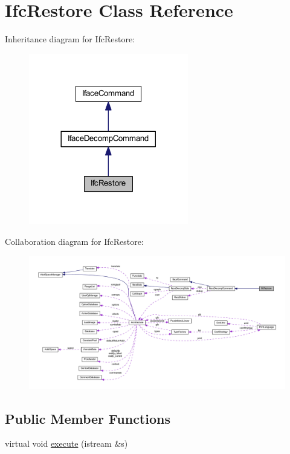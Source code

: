 \hypertarget{class_ifc_restore}{}\section{Ifc\+Restore Class Reference}
\label{class_ifc_restore}


Inheritance diagram for Ifc\+Restore\+:
\nopagebreak
\begin{figure}[H]
\begin{center}
\leavevmode
\includegraphics[width=197pt]{class_ifc_restore__inherit__graph}
\end{center}
\end{figure}


Collaboration diagram for Ifc\+Restore\+:
\nopagebreak
\begin{figure}[H]
\begin{center}
\leavevmode
\includegraphics[width=350pt]{class_ifc_restore__coll__graph}
\end{center}
\end{figure}
\subsection*{Public Member Functions}
\begin{DoxyCompactItemize}
\item 
virtual void \mbox{\hyperlink{class_ifc_restore_a19a9d5482d3aee44b2e0f548d69a12c4}{execute}} (istream \&s)
\end{DoxyCompactItemize}
